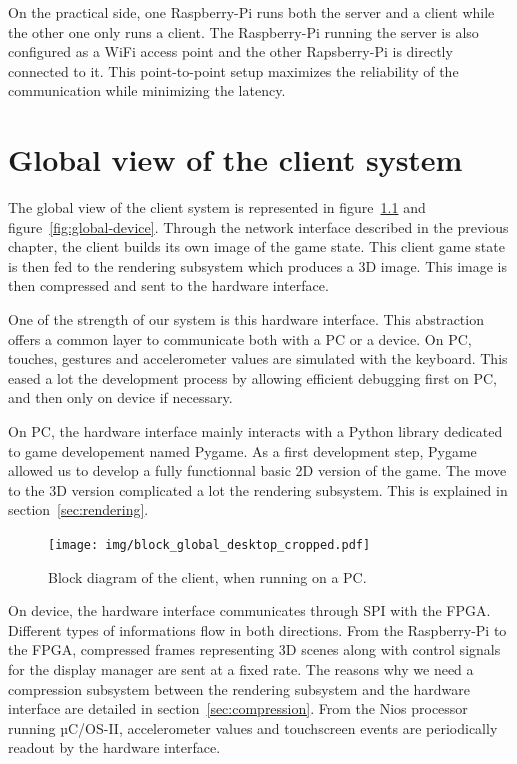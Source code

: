 \documentclass[english, DIV=13]{scrreprt}
\begin{document}
On the practical side, one Raspberry-Pi runs both the server and a client while the other
one only runs a client.
The Raspberry-Pi running the server is also configured as a WiFi access point and the other
Rapsberry-Pi is directly connected to it. This point-to-point setup maximizes the
reliability of the communication while minimizing the latency.

\chapter{Global view of the client system}
\label{chap:global-view}

The global view of the client system is represented in figure~\ref{fig:global-desktop}
and figure~\ref{fig:global-device}. Through the network interface described in the
previous chapter, the client builds its own image of the game state. This client game
state is then fed to the rendering subsystem which produces a 3D image. This image
is then compressed and sent to the hardware interface.

One of the strength of our system is this hardware interface. This abstraction offers
a common layer to communicate both with a PC or a device.
On PC, touches, gestures and accelerometer values are simulated with the keyboard.
This eased a lot the development process by allowing efficient debugging first on PC,
and then only on device if necessary.

On PC, the hardware interface mainly interacts with a Python library dedicated to game
developement named Pygame. As a first development step, Pygame allowed us to develop
a fully functionnal basic 2D version of the game. The move to the 3D version
complicated a lot the rendering subsystem. This is explained in
section~\ref{sec:rendering}.

\begin{figure}[bth]
    \centering
    \texttt{[image: img/block\_global\_desktop\_cropped.pdf]}
    \caption{Block diagram of the client, when running on a PC.}
    \label{fig:global-desktop}
\end{figure}

On device, the hardware interface communicates through SPI with the FPGA.
Different types of informations flow in both directions. From the Raspberry-Pi to the
FPGA, compressed frames representing 3D scenes along with control signals for the
display manager are sent at a fixed rate. The reasons why we need a compression
subsystem between the rendering subsystem and the hardware interface are detailed in
section~\ref{sec:compression}. From the Nios processor running µC/OS-II, accelerometer
values and touchscreen events are periodically readout by the hardware interface.
\end{document}
